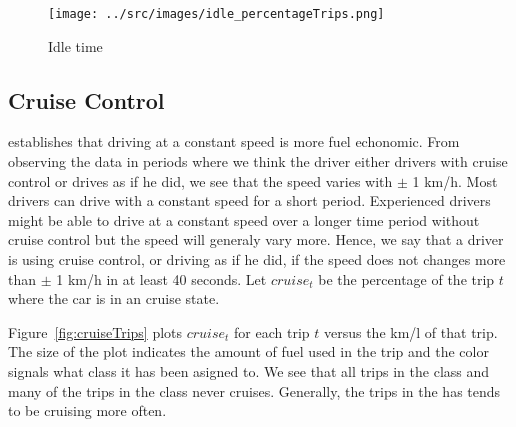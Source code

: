\begin{figure}[htb]
\centering
\texttt{[image: ../src/images/idle\_percentageTrips.png]}
\caption{Idle time}
\label{fig:idleTrips}
\end{figure}

\subsection{Cruise Control}

\cite{} establishes that driving at a constant speed is more fuel echonomic. 
From observing the data in periods where we think the driver either drivers with cruise control or drives as if he did, we see that the speed varies with $\pm$ 1 km/h.
Most drivers can drive with a constant speed for a short period. 
Experienced drivers might be able to drive at a constant speed over a longer time period without cruise control but the speed will generaly vary more. 
Hence, we say that a driver is using cruise control, or driving as if he did, if the speed does not changes more than $\pm$ 1 km/h in at least 40 seconds. %
Let $cruise_t$ be the percentage of the trip $t$ where the car is in an cruise state.

Figure~\ref{fig:cruiseTrips} plots $cruise_t$ for each trip $t$ versus the km/l of that trip.
The size of the plot indicates the amount of fuel used in the trip and the color signals what class it has been asigned to. 
We see that all trips in the \fuelLow class and many of the trips in the \fuelMedium class never cruises.
Generally, the trips in the \fuelHigh has tends to be cruising more often.


